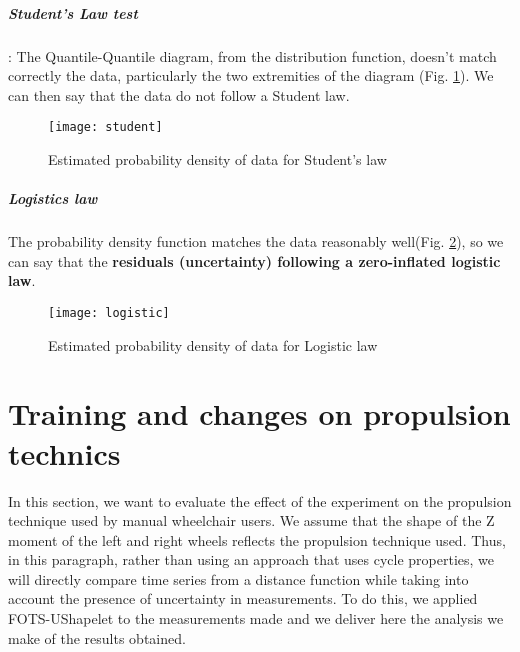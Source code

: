 \paragraph{Student's Law test}: The Quantile-Quantile diagram, from the distribution function, doesn't match correctly the data, particularly the two extremities of the diagram (Fig. \ref{student}). We can then say that the data do not follow a Student law.

\begin{figure}[h]
\centering
\texttt{[image: student]}
\caption{Estimated probability density of data for Student's law}
\label{student}
\end{figure}

\paragraph{Logistics law} The probability density function matches the data reasonably well(Fig. \ref{logistic}), so we can say that the \textbf{residuals (uncertainty) following a zero-inflated logistic law}.

\begin{figure}[h]
\centering
\texttt{[image: logistic]}
\caption{Estimated probability density of data for Logistic law}
\label{logistic}
\end{figure}









\chapter{Training and changes on propulsion technics}
\label{training_technic}
In this section, we want to evaluate the effect of the experiment on the propulsion technique used by manual wheelchair users. We assume that the shape of the Z moment of the left and right wheels reflects the propulsion technique used. Thus, in this paragraph, rather than using an approach that uses cycle properties, we will directly compare time series from a distance function while taking into account the presence of uncertainty in measurements. To do this, we applied FOTS-UShapelet to the measurements made and we deliver here the analysis we make of the results obtained.



